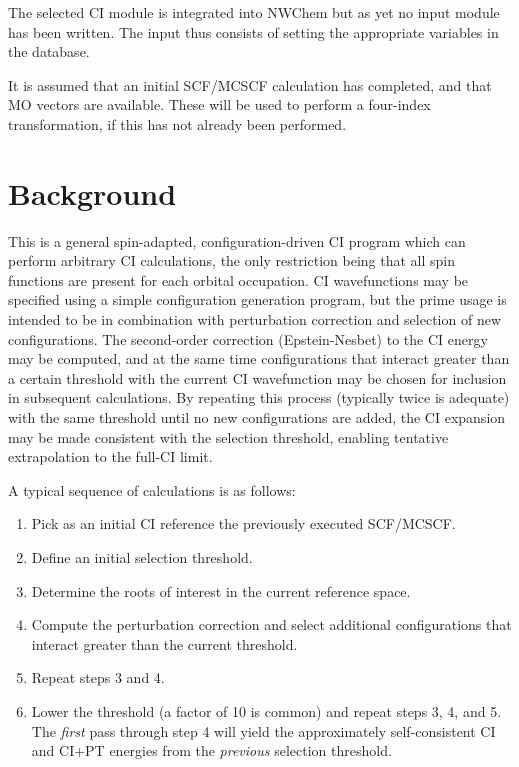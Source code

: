 \label{sec:selci}

The selected CI module is integrated into NWChem but as yet no
input module has been written.  The input thus consists of setting the
appropriate variables in the database.

It is assumed that an initial SCF/MCSCF calculation has completed, and
that MO vectors are available.  These will be used to perform a
four-index transformation, if this has not already been performed.

\section{Background}

This is a general spin-adapted, configuration-driven CI program
which can perform arbitrary CI calculations, the only restriction
being that all spin functions are present for each orbital occupation.
CI wavefunctions may be specified using a simple configuration
generation program, but the prime usage is intended to be in
combination with perturbation correction and selection of new
configurations.  The second-order correction (Epstein-Nesbet) to the
CI energy may be computed, and at the same time configurations that
interact greater than a certain threshold with the current CI
wavefunction may be chosen for inclusion in subsequent calculations.
By repeating this process (typically twice is adequate) with the same
threshold until no new configurations are added, the CI expansion may
be made consistent with the selection threshold, enabling tentative 
extrapolation to the full-CI limit.

A typical sequence of calculations is as follows:
\begin{enumerate}
\item Pick as an initial CI reference the previously executed
  SCF/MCSCF.
\item Define an initial selection threshold.
\item Determine the roots of interest in the current reference space.
\item Compute the perturbation correction and select additional
  configurations that interact greater than the current threshold.
\item Repeat steps 3 and 4.
\item Lower the threshold (a factor of 10 is common) and repeat steps
  3, 4, and 5.  The {\em first} pass through step 4 will yield the
  approximately self-consistent CI and CI+PT energies from the {\em
    previous} selection threshold.
\end{enumerate}

